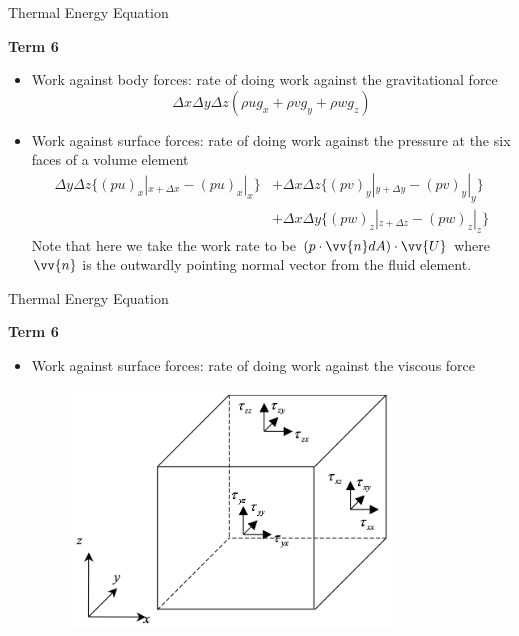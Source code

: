 \begin{frame}{Thermal Energy Equation}

\textbf{Term 6}
\begin{itemize}
	\item Work against body forces: rate of doing work against the gravitational force
	$$\Delta x \Delta y \Delta z (\rho ug_x + \rho vg_y + \rho w g_z)$$
	\item Work against surface forces: rate of doing work against the pressure at the six faces of a volume element
	\begin{align*}
		\Delta y\Delta z \{(pu)_x|_{x+\Delta x} - (pu)_x|_x\} &+ \Delta x\Delta z \{(pv)_y|_{y+\Delta y} - (pv)_y|_y\} \\&+ \Delta x\Delta y \{(pw)_z|_{z+\Delta z} - (pw)_z|_z\}
	\end{align*}
	Note that here we take the work rate to be $(p\cdot\vv{n}dA)\cdot\vv{U}$ where $\vv{n}$ is the outwardly pointing normal vector from the fluid element.
\end{itemize}
\end{frame}
\begin{frame}{Thermal Energy Equation}

\textbf{Term 6}
\begin{itemize}
	\item Work against surface forces: rate of doing work against the viscous force
	\begin{figure}
	\includegraphics[width=0.8\textwidth]{thermo2}	
	\end{figure}

\end{itemize}
\end{frame}
